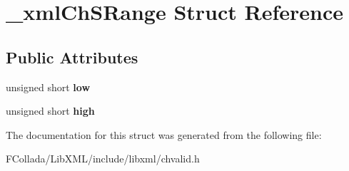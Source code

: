 \hypertarget{struct__xmlChSRange}{
\section{\_\-xmlChSRange Struct Reference}
\label{struct__xmlChSRange}
}
\subsection*{Public Attributes}
\begin{DoxyCompactItemize}
\item 
\hypertarget{struct__xmlChSRange_ae6678d601f260427bcad0fd8474df97d}{
unsigned short {\bfseries low}}
\label{struct__xmlChSRange_ae6678d601f260427bcad0fd8474df97d}

\item 
\hypertarget{struct__xmlChSRange_a050bc6f71d4bfcf455db4789ec725f1d}{
unsigned short {\bfseries high}}
\label{struct__xmlChSRange_a050bc6f71d4bfcf455db4789ec725f1d}

\end{DoxyCompactItemize}


The documentation for this struct was generated from the following file:\begin{DoxyCompactItemize}
\item 
FCollada/LibXML/include/libxml/chvalid.h\end{DoxyCompactItemize}
